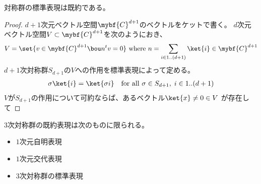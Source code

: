	\begin{proposition}[標準表現の既約性]\label{prop:標準表現の既約性} %
		対称群の標準表現は既約である。
	\end{proposition} %
	\begin{proof} %
		$d+1$次元ベクトル空間$\mybf{C}^{d+1}$のベクトルをケットで書く。
		$d$次元ベクトル空間$V\subset \mybf{C}^{d+1}$を次のようにおき、
		\begin{equation*}\begin{split} %
			V = \set{v\in \mybf{C}^{d+1}\bou n^tv=0} \text{ where }
			n = \sum_{i\in1..(d+1)}\ket{i}\in \mybf{C}^{d+1}
		\end{split}\end{equation*} %
		$d+1$次対称群$S_{d+1}$の$V$への作用を標準表現によって定める。
		\begin{equation*}\begin{split} %
			\sigma\ket{i} = \ket{\sigma i} \quad\text{for all }\sigma\in S_{d+1}
			,\;i\in1..(d+1)
		\end{split}\end{equation*} %
		$V$が$S_{d+1}$の作用について可約ならば、あるベクトル$\ket{x}\neq0\in V$
		が存在して
	\end{proof} %

	\begin{proposition}[対称群の既約表現]\label{prop:対称群の既約性} %
		$3$次対称群の既約表現は次のものに限られる。
		\begin{itemize}\setlength{\itemsep}{-1mm} %
			\item $1$次元自明表現
			\item $1$次元交代表現
			\item $3$次対称群の標準表現
		\end{itemize} %
	\end{proposition} %
